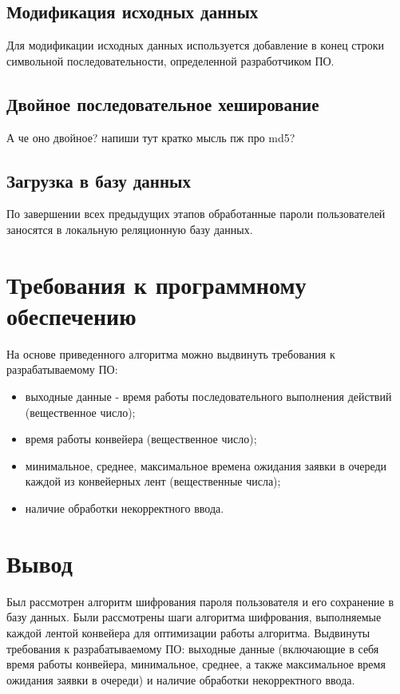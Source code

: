 \documentclass[12pt]{report}
\begin{document}
	\subsection{Модификация исходных данных}
	Для модификации исходных данных используется добавление в конец строки символьной последовательности, определенной разработчиком ПО.
	
	\subsection{Двойное последовательное хеширование}
	А че оно двойное? напиши тут кратко мысль пж про md5?
	
	\subsection{Загрузка в базу данных}
	По завершении всех предыдущих этапов обработанные пароли пользователей заносятся в локальную реляционную базу данных.
    
    \section{Требования к программному обеспечению}
    На основе приведенного алгоритма можно выдвинуть требования к разрабатываемому ПО:
    \begin{itemize}
    	\item выходные данные - время работы последовательного выполнения действий (вещественное число);
    	\item время работы конвейера (вещественное число);
    	\item минимальное, среднее, максимальное времена ожидания заявки в очереди каждой из конвейерных лент (вещественные числа);
    	\item наличие обработки некорректного ввода.
    \end{itemize}
	
    
    \section{Вывод}
    Был рассмотрен алгоритм шифрования пароля пользователя и его сохранение в базу данных.
    Были рассмотрены шаги алгоритма шифрования, выполняемые каждой лентой конвейера для оптимизации работы алгоритма.
    Выдвинуты требования к разрабатываемому ПО: выходные данные (включающие в себя время работы конвейера, минимальное, среднее, а также максимальное время ожидания заявки в очереди) и наличие обработки некорректного ввода.
    
\end{document}
